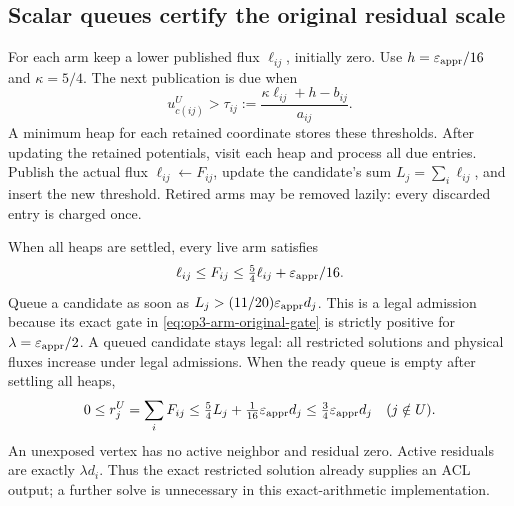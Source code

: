 \subsection{Scalar queues certify the original residual scale}

For each arm keep a lower published flux $\ell_{ij}$, initially zero.
Use $h=\varepsilon_{\mathrm{appr}}/16$ and $\kappa=5/4$. The next publication is due when
\begin{equation}
 u_{c(ij)}^U>
 \tau_{ij}:=\frac{\kappa\ell_{ij}+h-b_{ij}}{a_{ij}}.
 \label{eq:op3-arm-next-event}
\end{equation}
A minimum heap for each retained coordinate stores these thresholds.
After updating the retained potentials, visit each heap and process all
due entries. Publish the actual flux $\ell_{ij}\leftarrow F_{ij}$, update
the candidate's sum $L_j=\sum_i\ell_{ij}$, and insert the new threshold.
Retired arms may be removed lazily: every discarded entry is charged once.

When all heaps are settled, every live arm satisfies
\[
 \ell_{ij}\leq F_{ij}\leq\tfrac54\ell_{ij}+\varepsilon_{\mathrm{appr}}/16.
\]
Queue a candidate as soon as $L_j>(11/20)\varepsilon_{\mathrm{appr}} d_j$. This is a legal
admission because its exact gate in \cref{eq:op3-arm-original-gate} is
strictly positive for $\lambda=\varepsilon_{\mathrm{appr}}/2$. A queued candidate stays legal:
all restricted solutions and physical fluxes increase under legal admissions.
When the ready queue is empty after settling all heaps,
\begin{equation}
 0\leq r_j^U=\sum_i F_{ij}
 \leq\tfrac54L_j+\tfrac1{16}\varepsilon_{\mathrm{appr}} d_j
 \leq\tfrac34\varepsilon_{\mathrm{appr}} d_j
 \quad (j\notin U).
 \label{eq:op3-arm-terminal-residual}
\end{equation}
An unexposed vertex has no active neighbor and residual zero.
Active residuals are exactly $\lambda d_i$. Thus the exact restricted
solution already supplies an ACL output; a further solve is unnecessary
in this exact-arithmetic implementation.


